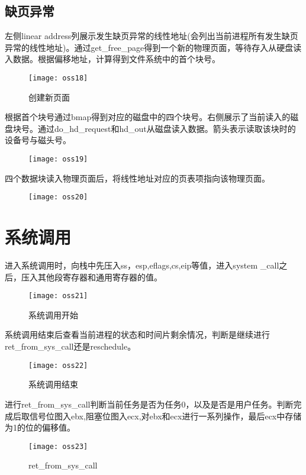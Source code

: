 \documentclass[]{report}
\begin{document}
\subsection{缺页异常}
左侧linear address列展示发生缺页异常的线性地址(会列出当前进程所有发生缺页异常的线性地址)。通过get\_free\_page得到一个新的物理页面，等待存入从硬盘读入数据。根据偏移地址，计算得到文件系统中的首个块号。
\begin{figure}[H]%
	\centering  %
	\texttt{[image: oss18]}  
	\caption{创建新页面}  %
	\label{fig37}
\end{figure}
根据首个块号通过bmap得到对应的磁盘中的四个块号。右侧展示了当前读入的磁盘块号。通过do\_hd\_request和hd\_out从磁盘读入数据。箭头表示读取该块时的设备号与磁头号。
\begin{figure}[H]%
	\centering  %
	\texttt{[image: oss19]}  
	\caption{}  %
	\label{fig38}
\end{figure}
四个数据块读入物理页面后，将线性地址对应的页表项指向该物理页面。
\begin{figure}[H]%
	\centering  %
	\texttt{[image: oss20]}  
	\caption{}  %
	\label{fig39}
\end{figure}
\section{系统调用}
进入系统调用时，向栈中先压入ss，esp,eflags,cs,eip等值，进入system
\_call之后，压入其他段寄存器和通用寄存器的值。
\begin{figure}[H]%
	\centering  %
	\texttt{[image: oss21]}  
	\caption{系统调用开始}  %
	\label{fig40}
\end{figure}
系统调用结束后查看当前进程的状态和时间片剩余情况，判断是继续进行ret\_from\_sys\_call还是reschedule。
\begin{figure}[H]%
	\centering  %
	\texttt{[image: oss22]}  
	\caption{系统调用结束} %
	\label{fig41}
\end{figure}
进行ret\_from\_sys\_call判断当前任务是否为任务0，以及是否是用户任务。判断完成后取信号位图入ebx,阻塞位图入ecx,对ebx和ecx进行一系列操作，最后ecx中存储为1的位的偏移值。
\begin{figure}[H]%
	\centering  %
	\texttt{[image: oss23]}  
	\caption{ret\_from\_sys\_call} %
	\label{fig42}
\end{figure}
\end{document}
